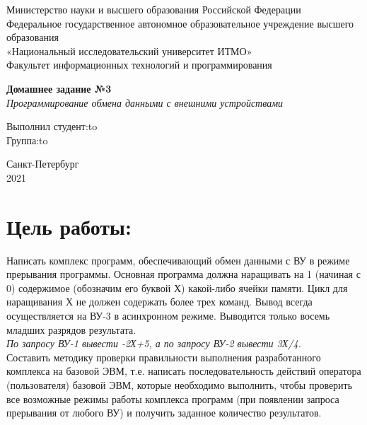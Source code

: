 \documentclass[a4paper,14pt]{article}
\begin{document}
\begin{titlepage}
\newpage

\begin{center}
Министерство науки и высшего образования Российской Федерации\\
Федеральное государственное автономное образовательное учреждение высшего образования\\
«Национальный исследовательский университет ИТМО»\\
Факультет информационных технологий и программирования\\
\end{center}

\vspace{\fill}

\begin{center}
\textbf{Домашнее задание №3}\\
\textit{Программирование обмена данными с внешними устройствами}
\end{center}

\vspace{\fill}

\newbox{\lbox}
\newlength{\maxl}
\setlength{\maxl}{\wd\lbox}
\hfill\parbox{14cm}{
\hspace*{5cm}Выполнил студент:\hfill\hbox to\\
\hspace*{5cm}Группа:\hfill\hbox to\\
}


\vspace{8em}

\begin{center}
Санкт-Петербург \\2021
\end{center}

\end{titlepage}


\section*{Цель работы:}
Написать комплекс программ, обеспечивающий обмен данными с ВУ в
режиме прерывания программы. Основная программа должна наращивать на 1
(начиная с 0) содержимое (обозначим его буквой Х) какой-либо ячейки памяти. Цикл
для наращивания Х не должен содержать более трех команд. Вывод всегда
осуществляется на ВУ-3 в асинхронном режиме. Выводится только восемь младших
разрядов результата.\\
\textit{По запросу ВУ-1 вывести -2Х+5, а по запросу ВУ-2 вывести 3Х/4.}\\
\indent
Составить методику проверки правильности выполнения разработанного
комплекса на базовой ЭВМ, т.е. написать последовательность действий оператора
(пользователя) базовой ЭВМ, которые необходимо выполнить, чтобы проверить все
возможные режимы работы комплекса программ (при появлении запроса
прерывания от любого ВУ) и получить заданное количество результатов.
\end{document}
